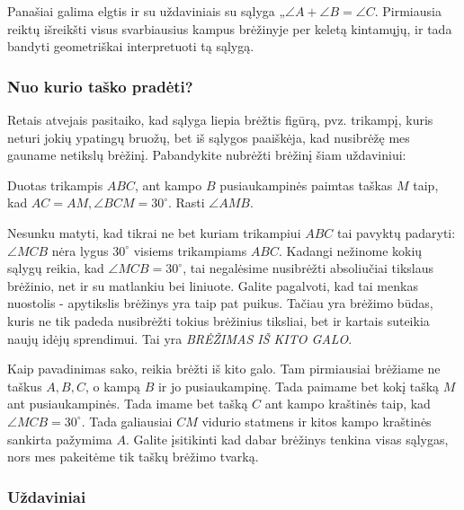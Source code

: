 Panašiai galima elgtis ir su uždaviniais su sąlyga „$\angle A + \angle B =
\angle C$. Pirmiausia reiktų išreikšti visus svarbiausius kampus brėžinyje
per keletą kintamųjų, ir tada bandyti geometriškai interpretuoti tą sąlygą.

\subsubsection{Nuo kurio taško pradėti?}
Retais atvejais pasitaiko, kad sąlyga liepia brėžtis figūrą,
pvz. trikampį, kuris neturi jokių ypatingų bruožų, bet iš sąlygos paaiškėja,
kad nusibrėžę mes gauname netikslų brėžinį. Pabandykite nubrėžti
brėžinį šiam uždaviniui:

\begin{pav}
Duotas trikampis $ABC$, ant kampo $B$ pusiaukampinės paimtas taškas $M$
taip, kad $AC=AM,\angle BCM=30^\circ$. Rasti $\angle AMB$.
\end{pav}

Nesunku matyti, kad tikrai ne bet kuriam trikampiui $ABC$ tai pavyktų padaryti:
$\angle MCB$ nėra lygus $30^\circ$ visiems trikampiams $ABC$. Kadangi nežinome kokių
sąlygų reikia, kad $\angle MCB=30^\circ$, tai negalėsime nusibrėžti absoliučiai
tikslaus brėžinio, net ir su matlankiu bei liniuote. Galite pagalvoti, kad tai menkas
nuostolis - apytikslis brėžinys yra taip pat puikus. Tačiau yra brėžimo būdas, kuris
ne tik padeda nusibrėžti tokius brėžinius tiksliai, bet ir kartais suteikia naujų idėjų
sprendimui. Tai yra \textit{BRĖŽIMAS IŠ KITO GALO}.

Kaip pavadinimas sako, reikia brėžti iš kito galo. Tam pirmiausiai brėžiame ne
taškus $A,B,C$, o kampą $B$ ir jo pusiaukampinę. Tada paimame bet kokį tašką $M$
ant pusiaukampinės. Tada imame bet tašką $C$ ant kampo kraštinės taip, kad 
$\angle MCB=30^\circ$. Tada galiausiai $CM$ vidurio statmens ir kitos kampo kraštinės
sankirta pažymima $A$. Galite įsitikinti kad dabar brėžinys tenkina visas sąlygas,
nors mes pakeitėme tik taškų brėžimo tvarką.

\subsubsection{Uždaviniai}

